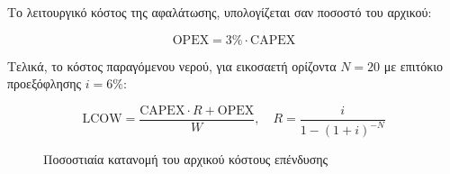 Το λειτουργικό κόστος της αφαλάτωσης, υπολογίζεται σαν ποσοστό του αρχικού:

\begin{equation}\label{eq:OPEX}
	\text{OPEX}=3\%\cdot \text{CAPEX}
\end{equation}

Τελικά, το κόστος παραγόμενου νερού, για εικοσαετή ορίζοντα \(Ν=20\) με
επιτόκιο προεξόφλησης \(i=6\%\):

\begin{equation}\label{eq:LCOW}
	\text{LCOW}= \frac{\text{CAPEX}\cdot R + \text{OPEX}}{W}, \quad R=\frac{i}{1-(1+i)^{-N}}
\end{equation}

\begin{figure}
	\centering
	\caption{Ποσοστιαία κατανομή του αρχικού κόστους επένδυσης}\label{fig:CAPEX}
\end{figure}
